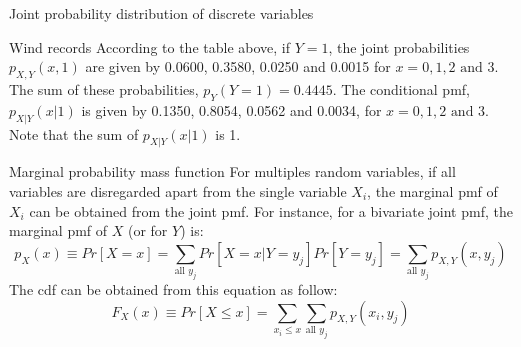 \documentclass[8pt]{beamer}
\renewcommand{\emph}[1]{\textcolor{myorange}{#1}}
\begin{document}
\begin{frame}{Joint probability distribution of discrete variables}
    \begin{exampleblock}{Wind records}
        According to the table above, if $Y = 1$, the joint probabilities $p_{X,Y} (x, 1)$  are given by 0.0600, 0.3580, 0.0250 and 0.0015 for $x = 0, 1, 2 \text{ and } 3$. The sum of these probabilities, $p_Y (Y=1) = 0.4445$. The conditional pmf, $p_{X|Y}(x|1)$ is given by 0.1350, 0.8054, 0.0562 and 0.0034, for $x = 0, 1, 2 \text{ and } 3$. Note that the sum of $p_{X|Y}(x|1)$ is 1.
    \end{exampleblock}

    \begin{block}{Marginal probability mass function}
        For multiples random variables, if all variables are disregarded apart from the single variable $X_i$, the \alert{marginal pmf} of $X_i$ can be obtained from the joint \emph{pmf}. For instance, for a bivariate joint \emph{pmf}, the marginal \emph{pmf} of $X$ (or for $Y$) is:
        \[
            \displaystyle
            p_X (x) \equiv Pr[X = x] = \sum_{\text{all } y_j} Pr[X=x | Y = y_j] Pr[Y= y_j] = \sum_{\text{all } y_j} p_{X,Y} (x, y_j)
        \]
        The \emph{cdf} can be obtained from this equation as follow:
        \[
            \displaystyle
            F_X (x) \equiv Pr[X \leq x] = \sum_{x_i \leq x} \sum_{\text{all } y_j}  p_{X,Y} (x_i, y_j)
        \]
   \end{block}
\end{frame}
\end{document}
